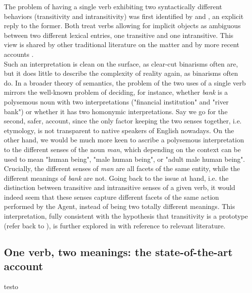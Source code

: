 The problem of having a single verb exhibiting two syntactically different behaviors (transitivity and intransitivity) was first identified by \textcite{fodor1980functional} and \textcite{dowty1981quantification}, an explicit reply to the former. Both treat verbs allowing for implicit objects as ambiguous between two different lexical entries, one transitive and one intransitive. This view is shared by other traditional literature on the matter \parencite{Cote1996, Mittwoch1982, vanvalinlapolla1997syntax, brisson1994licensing} and by more recent accounts \parencite{PethoKardos2006, BourmayanRecanati2013}.\\
Such an interpretation is clean on the surface, as clear-cut binarisms often are, but it does little to describe the complexity of reality \textemdash again, as binarisms often do. In a broader theory of semantics, the problem of the two uses of a single verb mirrors the well-known problem of deciding, for instance, whether \textit{bank} is a polysemous noun with two interpretations ("financial institution" and "river bank") or whether it has two homonymic interpretations. Say we go for the second, safer, account, since the only factor keeping the two senses together, i.e. etymology, is not transparent to native speakers of English nowadays. On the other hand, we would be much more keen to ascribe a polysemous interpretation to the different senses of the noun \textit{man}, which depending on the context can be used to mean "human being", "male human being", or "adult male human being". Crucially, the different senses of \textit{man} are all facets of the same entity, while the different meanings of \textit{bank} are not. Going back to the issue at hand, i.e. the distinction between transitive and intransitive senses of a given verb, it would indeed seem that these senses capture different facets of the same action performed by the Agent, instead of being two totally different meanings. This interpretation, fully consistent with the hypothesis that transitivity is a prototype (refer back to ), is further explored in  with reference to relevant literature.


\subsection{One verb, two meanings: the state-of-the-art account} 

testo


